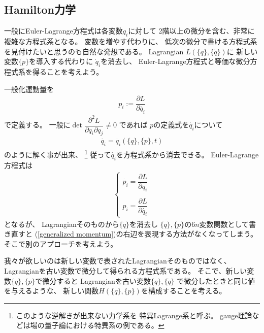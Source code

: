 \documentclass[dvipdfmx]{jsarticle}
\begin{document}
\subsection{Hamilton力学}

一般にEuler-Lagrange方程式は各変数$q_i$に対して
2階以上の微分を含む、非常に複雑な方程式系となる。
変数を増やす代わりに、
低次の微分で書ける方程式系を見付けたいと思うのも自然な発想である。
Lagrangian $L(\{q\},\{\dot{q}\})$に
新しい変数$\{p\}$を導入する代わりに
$\dot{q}_i$を消去し、
Euler-Lagrange方程式と等価な微分方程式系を得ることを考えよう。

一般化運動量を
\begin{align}
  p_i := \dfrac{\partial L}{\partial \dot{q_i}}
\label{generalized momentum}
\end{align}
で定義する。
一般に$\det \dfrac{\partial^2 L}{\partial q_i \partial q_j} \neq 0 $
であれば
$p$の定義式を$\dot{q_i}$について
\begin{align}
  \dot{q_i} = \dot{q_i}(\{q\},\{p\},t)
\end{align}
のように解く事が出来、
\footnote{
  このような逆解きが出来ない力学系を
  特異Lagrange系と呼ぶ。
  gauge理論などは場の量子論における特異系の例である。
}
従って$\dot{q_i}$を方程式系から消去できる。
Euler-Lagrange方程式は
\begin{align}
  \begin{cases}
    \dot{p_i} = \dfrac{\partial L}{\partial q_i}
\\    \\
      p_i = \dfrac{\partial L}{\partial \dot{q_i}}   
  \end{cases}
\label{Euler-Lagrange with p}
\end{align}
となるが、
Lagrangianそのものから$\{\dot{q}\}$を消去し
$\{q\},\{p\}$の$6n$変数関数として書き直すと
(\ref{generalized momentum})の右辺を表現する方法がなくなってしまう。
そこで別のアプローチを考えよう。

我々が欲しいのは新しい変数で表されたLagrangianそのものではなく、
Lagrangianを古い変数で微分して得られる方程式系である。
そこで、新しい変数$\{q\},\{p\}$で微分すると
Lagrangianを古い変数$\{q\}, \{\dot{q}\}$
で微分したときと同じ値を与えるような、
新しい関数$H(\{q\},\{p\})$を構成することを考える。
\end{document}
